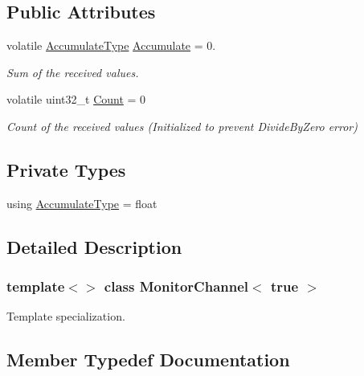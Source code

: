 \subsection*{Public Attributes}
\begin{DoxyCompactItemize}
\item 
volatile \hyperlink{classMonitorChannel_3_01true_01_4_af2569e58417243595e129831ac287351}{Accumulate\+Type} \hyperlink{classMonitorChannel_3_01true_01_4_a8453948b697c84ac31a0d3d6305e7e9a}{Accumulate} = 0.
\begin{DoxyCompactList}\small\item\em Sum of the received values. \end{DoxyCompactList}\item 
volatile uint32\+\_\+t \hyperlink{classMonitorChannel_3_01true_01_4_a7c4f5908f8b795e1a951cc8224a68de7}{Count} = 0
\begin{DoxyCompactList}\small\item\em Count of the received values (Initialized to prevent Divide\+By\+Zero error) \end{DoxyCompactList}\end{DoxyCompactItemize}
\subsection*{Private Types}
\begin{DoxyCompactItemize}
\item 
using \hyperlink{classMonitorChannel_3_01true_01_4_af2569e58417243595e129831ac287351}{Accumulate\+Type} = float
\end{DoxyCompactItemize}


\subsection{Detailed Description}
\subsubsection*{template$<$$>$\newline
class Monitor\+Channel$<$ true $>$}

Template specialization. 

\subsection{Member Typedef Documentation}
\mbox{\label{classMonitorChannel_3_01true_01_4_af2569e58417243595e129831ac287351}} 
